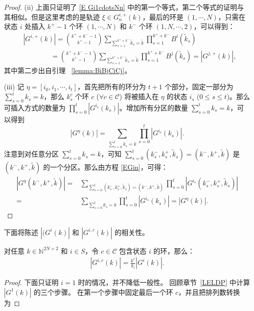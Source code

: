 \begin{appendices}
\begin{proof}
	(ii) 上面只证明了 \eqref{E Gi1cdotsNn} 中的第一个等式，第二个等式的证明与其相似。但是这里考虑的是轨迹 $\xi\in G^{i,+}_n(k)$，最后的环是 $(1,\cdots,N)$，只需在状态 $i$ 处插入 $k^+-1$ 个环 $(1,\cdots,N)$ 和 $k^-$ 个环 $(1,N,\cdots,2)$，可以得到：
	\begin{align*}
		&\left|G^{i,+}\left(k\right)\right|=\binom{k^++k^--1}{k^+-1}\sum_{\sum_{s=1}^{k^++k^-}\tilde{k}_s=\tilde{k}}\prod_{s=1}^{k^++k^-}B^i\left(\tilde{k}_s\right)\\
		&\qquad\qquad=\binom{k^++k^--1}{k^+-1}\sum_{\sum_{s=1}^{k^++k^-}\tilde{k}_s=\tilde{k}}\prod_{s=1}^{k^++k^-}B^j\left(\tilde{k}_s\right)=\left|G^{j,+}\left(k\right)\right|,
	\end{align*}
	其中第二步出自引理 ~\ref{lemma:BiBjCiCj}。

	(iii) 记 $\eta=[i_0,i_1,\cdots,i_t]$，首先把所有的环分为 $t+1$ 个部分，固定一部分为 $\sum_{s=0}^t k_s=k$，那么 $k^c_s$ 个环 $c$ ($\forall c\in\mathcal{C}$) 将被插入在 $\eta$ 的状态 $i_s$ ($0\le s\le t$)。那么可插入方式的数量为 $\prod_{s=0}^t |G^{i_s}(k_s)|$。增加所有分区的数量 $\sum_{s=0}^t k_s=k$，可以得到
	\begin{equation*}
		\left|G^{\eta}(k)\right|=\sum_{\sum_{s=0}^t k_s=k}\prod_{s=0}^t \left|G^{i_s}(k_s)\right|.
	\end{equation*}
	注意到对任意分区 $\sum_{s=0}^t k_s=k$，可知 $\sum_{s=0}^t (k_s^-,k_s^+,\tilde{k}_s)=(k^-,k^+,\tilde{k})$ 是 $(k^-,k^+,\tilde{k})$ 的一个分区。那么由方程 \eqref{EGin}，可得：
	\begin{align*}
		\left|G^{\eta}(k^-,k^+,\tilde{k})\right|=&\sum_{\sum_{s=0}^t (k_s^-,k_s^+,\tilde{k}_s)=(k^-,k^+,\tilde{k})}\prod_{s=0}^t \left|G^{i_s}(k_s^-,k_s^+,\tilde{k}_s)\right|\\
		=&\sum_{\sum_{s=0}^t k_s=k}\prod_{s=0}^t \left|G^{i_s}(k_s)\right|=\left|G^{\eta}(k)\right|.
	\end{align*}
\end{proof}
下面将陈述 $| (G^i(k)|$ 和 $|G^{i,c}(k)|$ 的相关性。
\begin{lemma}\label{lemma:E G1cnk}
	对任意 $k\in \mathbb{N}^{2N+2}$ 和 $i\in S$，令 $c\in \mathcal{C}$ 包含状态 $i$ 的环，那么：
	\begin{align*}
		\left|G^{i,c}(k)\right| = \frac{k^c}{k_i}\left|G^i(k)\right|.
	\end{align*}
\end{lemma}
\begin{proof}
	下面只证明 $i=1$ 时的情况，并不降低一般性。 回顾章节~\ref{LELDP} 中计算 $|G^1(k)|$ 的三个步骤。
	在第一个步骤中固定最后一个环 $c$，并且把排列数转换为

\end{proof}
\end{appendices}
